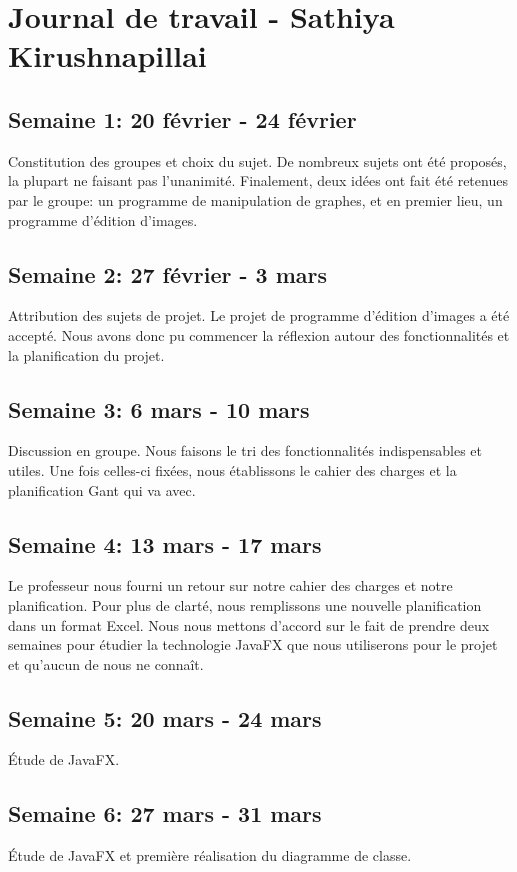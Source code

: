 \section{Journal de travail - Sathiya Kirushnapillai}

\subsection{Semaine 1: 20 février - 24 février}
Constitution des groupes et choix du sujet. De nombreux sujets ont été proposés, la plupart ne faisant pas l'unanimité. Finalement, deux idées ont fait été retenues par le groupe: un programme de manipulation de graphes, et en premier lieu, un programme d'édition d'images.

\subsection{Semaine 2: 27 février - 3 mars}
Attribution des sujets de projet. Le projet de programme d'édition d'images a été accepté. Nous avons donc pu commencer la réflexion autour des fonctionnalités et la planification du projet.

\subsection{Semaine 3: 6 mars - 10 mars}
Discussion en groupe. Nous faisons le tri des fonctionnalités indispensables et utiles. Une fois celles-ci fixées, nous établissons le cahier des charges et la planification Gant qui va avec.

\subsection{Semaine 4: 13 mars - 17 mars}
Le professeur nous fourni un retour sur notre cahier des charges et notre planification. Pour plus de clarté, nous remplissons une nouvelle planification dans un format Excel. Nous nous mettons d'accord sur le fait de prendre deux semaines pour étudier la technologie JavaFX que nous utiliserons pour le projet et qu'aucun de nous ne connaît.

\subsection{Semaine 5: 20 mars - 24 mars}
Étude de JavaFX.

\subsection{Semaine 6: 27 mars - 31 mars}
Étude de JavaFX et première réalisation du diagramme de classe.

